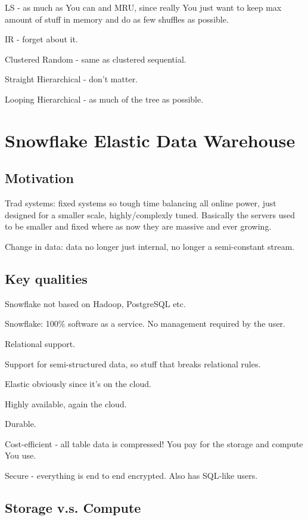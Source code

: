 \documentclass{article}
\begin{document}
	LS - as much as You can and MRU, since really You just want to keep max amount of stuff in memory and do as few shuffles as possible.
	
	IR - forget about it.
	
	Clustered Random - same as clustered sequential.
	
	Straight Hierarchical - don't matter.
	
	Looping Hierarchical - as much of the tree as possible.
	
	
	
	
	

\section{Snowflake Elastic Data Warehouse}

	\subsection{Motivation}
	
		Trad systems: fixed systems so tough time balancing all online power, just designed for a smaller scale, highly/complexly tuned. 
		Basically the servers used to be smaller and fixed where as now  they are massive and ever growing.
		
		Change in data: data no longer just internal, no longer a semi-constant stream.
	
	\subsection{Key qualities}
	
		Snowflake not based on Hadoop, PostgreSQL etc.
		
		Snowflake: 100\% software as a service. No management required by the user.
		
		Relational support.
		
		Support for semi-structured data, so stuff  that breaks relational rules.
		
		Elastic obviously since it's on the cloud.
		
		Highly available, again the cloud.
		
		Durable.
		
		Cost-efficient - all table data is compressed! You pay for the storage and compute You use. 
		
		Secure - everything is end to end encrypted. Also has SQL-like users.
		
	\subsection{Storage v.s. Compute}
	
\end{document}
